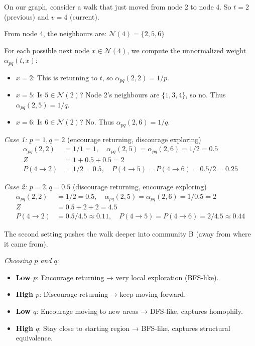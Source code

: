 \begin{notechapter}
\begin{example}
On our graph, consider a walk that just moved from node 2 to node 4. So $t = 2$ (previous) and $v = 4$ (current).

From node 4, the neighbours are: $\mathcal{N}(4) = \{2, 5, 6\}$

For each possible next node $x \in \mathcal{N}(4)$, we compute the unnormalized weight $\alpha_{pq}(t, x)$:
\begin{itemize}
    \item $x = 2$: This is returning to $t$, so $\alpha_{pq}(2, 2) = 1/p$.
    \item $x = 5$: Is $5 \in \mathcal{N}(2)$? Node 2's neighbours are $\{1, 3, 4\}$, so no. Thus $\alpha_{pq}(2, 5) = 1/q$.
    \item $x = 6$: Is $6 \in \mathcal{N}(2)$? No. Thus $\alpha_{pq}(2, 6) = 1/q$.
\end{itemize}

\emph{Case 1:} $p=1, q=2$ (encourage returning, discourage exploring)
\begin{align*}
\alpha_{pq}(2,2) &= 1/1 = 1, \quad \alpha_{pq}(2,5) = \alpha_{pq}(2,6) = 1/2 = 0.5 \\
Z &= 1 + 0.5 + 0.5 = 2 \\
P(4 \to 2) &= 1/2 = 0.5, \quad P(4 \to 5) = P(4 \to 6) = 0.5/2 = 0.25
\end{align*}

\emph{Case 2:} $p=2, q=0.5$ (discourage returning, encourage exploring)
\begin{align*}
\alpha_{pq}(2,2) &= 1/2 = 0.5, \quad \alpha_{pq}(2,5) = \alpha_{pq}(2,6) = 1/0.5 = 2 \\
Z &= 0.5 + 2 + 2 = 4.5 \\
P(4 \to 2) &= 0.5/4.5 \approx 0.11, \quad P(4 \to 5) = P(4 \to 6) = 2/4.5 \approx 0.44
\end{align*}

The second setting pushes the walk deeper into community B (away from where it came from).
\end{example}

\begin{keyidea}
\emph{Choosing $p$ and $q$}:
\begin{itemize}
    \item \textbf{Low $p$}: Encourage returning → very local exploration (BFS-like).
    \item \textbf{High $p$}: Discourage returning → keep moving forward.
    \item \textbf{Low $q$}: Encourage moving to new areas → DFS-like, captures homophily.
    \item \textbf{High $q$}: Stay close to starting region → BFS-like, captures structural equivalence.
\end{itemize}


\end{keyidea}
\end{notechapter}

